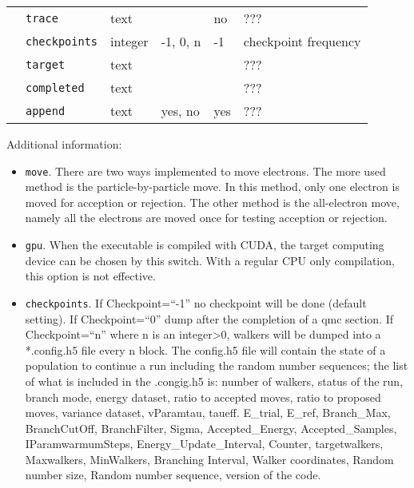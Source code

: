 \begin{table}[h]
\begin{center}
\begin{tabularx}{\textwidth}{l l l l l l }
   &   \texttt{trace}         &  text              &                  & no                & ???                      \\
   &   \texttt{checkpoints}   &  integer           &   -1, 0, n       & -1                & checkpoint frequency \\
   &   \texttt{target}        &  text              &                  &                   & ???  \\
   &   \texttt{completed}     &  text              &                  &                   & ???  \\
   &   \texttt{append}        &  text              &   yes, no        & yes               & ???  \\
\hline

\end{tabularx}
\end{center}
\end{table}

Additional information:
\begin{itemize}
\item \texttt{move}. There are two ways implemented to move electrons. The more used method is the particle-by-particle move. In this method, only one electron is moved for acception or rejection. The other method is the all-electron move, namely all the electrons are moved once for testing acception or rejection.

\item \texttt{gpu}. When the executable is compiled with CUDA, the target computing device can be chosen by this switch. With a regular CPU only compilation, this option is not effective.

\item \texttt{checkpoints}. If Checkpoint=``-1'' no checkpoint will be done (default setting). If Checkpoint=``0'' dump after the completion of a qmc section. If Checkpoint=``n'' where n is an integer>0, walkers will be dumped into a *.config.h5 file every n block. The config.h5 file will contain the state of a population to continue a run including the random number sequences; the list of what is included in the .congig.h5 is: number of walkers, status of the run, branch mode, energy dataset, ratio to accepted moves, ratio to proposed moves, variance dataset, vParam{tau, taueff. E_trial, E_ref, Branch_Max, BranchCutOff, BranchFilter, Sigma, Accepted_Energy, Accepted_Samples}, IParam{warmumSteps, Energy_Update_Interval, Counter, targetwalkers, Maxwalkers, MinWalkers, Branching Interval}, Walker coordinates, Random number size, Random number sequence, version of the code.

\end{itemize}
